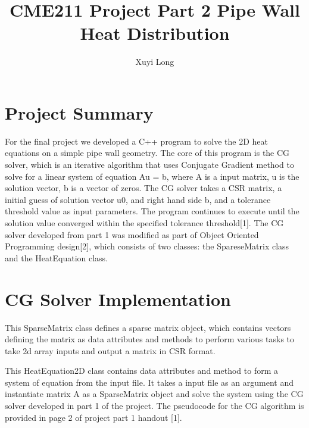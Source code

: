\documentclass{article}
\title{CME211 Project Part 2 Pipe Wall Heat Distribution}
\author{Xuyi Long}
\begin{document}
\maketitle


\section{Project Summary}

For the final project we developed a C++ program to solve the 2D heat equations on a simple pipe wall geometry. The core of this program is the CG solver, which is an iterative algorithm that uses Conjugate Gradient method to solve for a linear system of equation Au = b, where A is a input matrix, u is the solution vector, b is a vector of zeros. The CG solver takes a CSR matrix, a initial guess of solution vector u0, and right hand side b, and a tolerance threshold value as input parameters. The program continues to execute until the solution value converged within the specified tolerance threshold[1]. The CG solver developed from part 1 was modified as part of Object Oriented Programming design[2], which consists of two classes: the SpareseMatrix class and the HeatEquation class.



\section{CG Solver Implementation}

This SparseMatrix class defines a sparse matrix object, which contains vectors defining the matrix as data attributes and methods to perform various tasks to take 2d array inputs and output a matrix in CSR format.

This HeatEquation2D class contains data attributes and method to form a system of equation from the input file. It takes a input file as an argument and instantiate matrix A as a SparseMatrix object and solve the system using the CG solver developed in part 1 of the project. The pseudocode for the CG algorithm is provided in page 2 of project part 1 handout [1]. 
\end{document}
